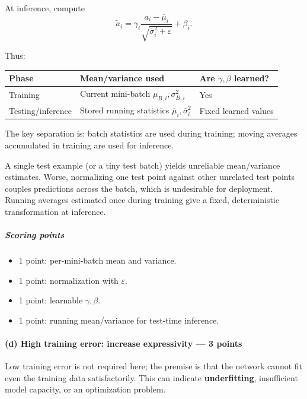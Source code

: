 \documentclass[11pt,a4paper]{article}
\theoremstyle{definition}
\begin{document}
At inference, compute
\[
\boxed{
\widetilde{a}_i
=
\gamma_i
\frac{a_i-\overline{\mu}_i}
{\sqrt{\overline{\sigma}_i^2+\varepsilon}}
+
\beta_i.
}
\]

Thus:

{\footnotesize
\setlength{\tabcolsep}{3pt}
\renewcommand{\arraystretch}{1.2}
\noindent
\begin{tabularx}{\linewidth}{|
  >{\raggedright\arraybackslash}p{3.2cm}|
  >{\raggedright\arraybackslash}X|
  >{\raggedright\arraybackslash}X|
}
\hline
\textbf{Phase} & \textbf{Mean/variance used} & \textbf{Are $\gamma,\beta$ learned?} \\
\hline
Training & Current mini-batch $\mu_{B,i},\sigma^2_{B,i}$ & Yes \\
\hline
Testing/inference & Stored running statistics $\overline{\mu}_i,\overline{\sigma}_i^2$ & Fixed learned values \\
\hline
\end{tabularx}
}

The key separation is: batch statistics are used during training; moving averages accumulated in training are used for inference.

\begin{remark}
A single test example (or a tiny test batch) yields unreliable mean/variance estimates. Worse, normalizing one test point against other unrelated test points couples predictions across the batch, which is undesirable for deployment. Running averages estimated once during training give a fixed, deterministic transformation at inference.
\end{remark}

\subparagraph{Scoring points}
\begin{itemize}
    \item 1 point: per-mini-batch mean and variance.
    \item 1 point: normalization with $\varepsilon$.
    \item 1 point: learnable $\gamma,\beta$.
    \item 1 point: running mean/variance for test-time inference.
\end{itemize}


\paragraph{(d) High training error: increase expressivity --- 3 points}

Low training error is not required here; the premise is that the network cannot fit even the training data satisfactorily. This can indicate \textbf{underfitting}, insufficient model capacity, or an optimization problem.
\end{document}
